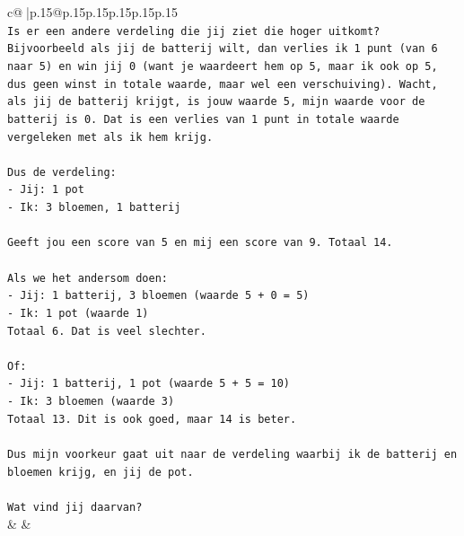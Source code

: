\documentclass{article}
\begin{document}
{\begin{supertabular}{c@{$\;$}|p{.15\linewidth}@{}p{.15\linewidth}p{.15\linewidth}p{.15\linewidth}p{.15\linewidth}p{.15\linewidth}}
{{{\\ 
\texttt{Is er een andere verdeling die jij ziet die hoger uitkomt? Bijvoorbeeld als jij de batterij wilt, dan verlies ik 1 punt (van 6 naar 5) en win jij 0 (want je waardeert hem op 5, maar ik ook op 5, dus geen winst in totale waarde, maar wel een verschuiving). Wacht, als jij de batterij krijgt, is jouw waarde 5, mijn waarde voor de batterij is 0. Dat is een verlies van 1 punt in totale waarde vergeleken met als ik hem krijg.} \\
\\ 
\texttt{Dus de verdeling:} \\
\texttt{{-} Jij: 1 pot} \\
\texttt{{-} Ik: 3 bloemen, 1 batterij} \\
\\ 
\texttt{Geeft jou een score van 5 en mij een score van 9. Totaal 14.} \\
\\ 
\texttt{Als we het andersom doen:} \\
\texttt{{-} Jij: 1 batterij, 3 bloemen (waarde 5 + 0 = 5)} \\
\texttt{{-} Ik: 1 pot (waarde 1)} \\
\texttt{Totaal 6. Dat is veel slechter.} \\
\\ 
\texttt{Of:} \\
\texttt{{-} Jij: 1 batterij, 1 pot (waarde 5 + 5 = 10)} \\
\texttt{{-} Ik: 3 bloemen (waarde 3)} \\
\texttt{Totaal 13. Dit is ook goed, maar 14 is beter.} \\
\\ 
\texttt{Dus mijn voorkeur gaat uit naar de verdeling waarbij ik de batterij en bloemen krijg, en jij de pot.} \\
\\ 
\texttt{Wat vind jij daarvan?} \\
            }
        }
    }
    & & \\ \\


\end{supertabular}}
\end{document}
